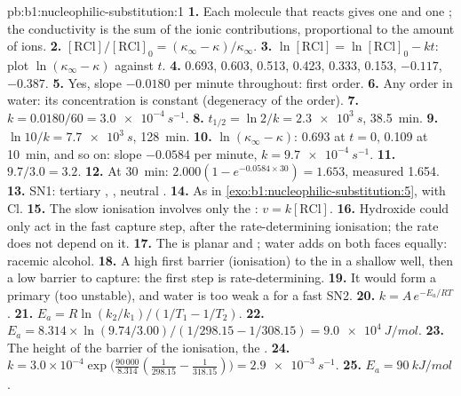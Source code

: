 \begin{solution}{pb:b1:nucleophilic-substitution:1}
\textbf{1.} Each molecule that reacts gives one  and one ;
the conductivity is the sum of the ionic contributions, proportional to
the amount of ions.
\textbf{2.} $[\mathrm{RCl}]/[\mathrm{RCl}]_0 = (\kappa_\infty -
\kappa)/\kappa_\infty$.
\textbf{3.} $\ln[\mathrm{RCl}] = \ln[\mathrm{RCl}]_0 - kt$: plot
$\ln(\kappa_\infty - \kappa)$ against $t$.
\textbf{4.} 0.693, 0.603, 0.513, 0.423, 0.333, 0.153, $-0.117$, $-0.387$.
\textbf{5.} Yes, slope $-0.0180$ per minute throughout: first order.
\textbf{6.} Any order in water: its concentration is constant
(degeneracy of the order).
\textbf{7.} $k = 0.0180/60 = \qty{3.0e-4}{s^{-1}}$.
\textbf{8.} $t_{1/2} = \ln 2/k = \qty{2.3e3}{s}$, \qty{38.5}{min}.
\textbf{9.} $\ln 10/k = \qty{7.7e3}{s}$, \qty{128}{min}.
\textbf{10.} $\ln(\kappa_\infty - \kappa)$: 0.693 at $t = 0$, 0.109 at
\qty{10}{min}, and so on: slope $-0.0584$ per minute, $k = \qty{9.7e-4}{s^{-1}}$.
\textbf{11.} $9.7/3.0 = 3.2$.
\textbf{12.} At \qty{30}{min}: $2.000(1 - e^{-0.0584 \times 30}) = 1.653$,
measured 1.654.
\textbf{13.} SN1: tertiary , , neutral .
\textbf{14.} As in \cref{exo:b1:nucleophilic-substitution:5}, with Cl.
\textbf{15.} The slow ionisation involves only the : $v =
k[\mathrm{RCl}]$.
\textbf{16.} Hydroxide could only act in the fast capture step, after the
rate-determining ionisation; the rate does not depend on it.
\textbf{17.} The  is planar and ; water adds on both
faces equally: racemic alcohol.
\textbf{18.} A high first barrier (ionisation) to the  in a
shallow well, then a low barrier to capture: the first step is
rate-determining.
\textbf{19.} It would form a primary  (too unstable), and water
is too weak a  for a fast SN2.
\textbf{20.} $k = A\,e^{-E_a/RT}$.
\textbf{21.} $E_a = R\ln(k_2/k_1)/(1/T_1 - 1/T_2)$.
\textbf{22.} $E_a = 8.314 \times \ln(9.74/3.00)/(1/298.15 - 1/308.15) =
\qty{9.0e4}{J/mol}$.
\textbf{23.} The height of the barrier of the ionisation, the
.
\textbf{24.} $k = 3.0 \times 10^{-4} \exp\bigl(\frac{90\,000}{8.314}
(\frac{1}{298.15} - \frac{1}{318.15})\bigr) = \qty{2.9e-3}{s^{-1}}$.
\textbf{25.} \textbf{$E_a = \qty{90}{kJ/mol}$}.
\end{solution}
